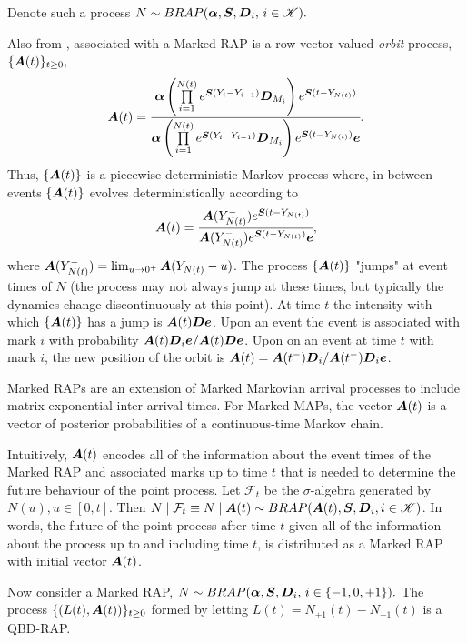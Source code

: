 Denote such a process \(N\sim BRAP(\boldsymbol \alpha, \boldsymbol S, \boldsymbol D_i,\,i\in\mathscr K).\)

Also from \cite{bn2010}, associated with a Marked RAP is a row-vector-valued \emph{orbit} process, \(\{\boldsymbol A(t)\}_{t\geq0},\)
\[\boldsymbol A(t) = \cfrac{\boldsymbol \alpha\left( \prod\limits_{i=1}^{N(t)} e^{\boldsymbol S(Y_{i}-Y_{i-1})}\boldsymbol D_{M_i}\right)e^{\boldsymbol S (t-Y_{N(t)})}}{\boldsymbol \alpha\left( \prod\limits_{i=1}^{N(t)} e^{\boldsymbol S(Y_{i}-Y_{i-1})}\boldsymbol D_{M_i}\right)e^{\boldsymbol S( t-Y_{N(t)})}\boldsymbol e}.\]
Thus, \(\{\boldsymbol A(t)\}\) is a piecewise-deterministic Markov process where, in between events \(\{\boldsymbol A(t)\}\) evolves deterministically according to 
\[\boldsymbol A(t) = \cfrac{\boldsymbol A(Y_{N(t)}^-)e^{\boldsymbol S(t-Y_{N(t)})}}{\boldsymbol A(Y_{N(t)}^-)e^{\boldsymbol S(t-Y_{N(t)})}\boldsymbol e},\]
where \(\boldsymbol A(Y_{N(t)}^-) = \lim_{u\to 0^+}\boldsymbol A(Y_{N(t)}-u)\). The process \(\{\boldsymbol A(t)\}\) "jumps" at event times of \(N\) (the process may not always jump at these times, but typically the dynamics change discontinuously at this point). At time \(t\) the intensity with which \(\{\boldsymbol A(t)\}\) has a jump is \(\boldsymbol A(t) \boldsymbol D\boldsymbol e\). Upon an event the event is associated with mark \(i\) with probability \(\boldsymbol A(t) \boldsymbol D_i\boldsymbol e/\boldsymbol A(t) \boldsymbol D\boldsymbol e\). Upon on an event at time \(t\) with mark \(i\), the new position of the orbit is \(\boldsymbol A(t) = \boldsymbol A(t^-) \boldsymbol D_i/\boldsymbol A(t^-) \boldsymbol D_i\boldsymbol e\). 

Marked RAPs are an extension of Marked Markovian arrival processes to include matrix-exponential inter-arrival times. For Marked MAPs, the vector \(\boldsymbol A(t)\) is a vector of posterior probabilities of a continuous-time Markov chain. 

Intuitively, \(\boldsymbol A(t)\) encodes all of the information about the event times of the Marked RAP and associated marks up to time \(t\) that is needed to determine the future behaviour of the point process. Let \(\mathcal F_{t}\) be the \(\sigma\)-algebra generated by \(N(u), u\in[0,t]\). Then \(N\mid \mathcal F_t \equiv N\mid \boldsymbol A(t) \sim BRAP(\boldsymbol A(t), \boldsymbol S, \boldsymbol D_i,i\in\mathscr K)\). In words, the future of the point process after time \(t\) given all of the information about the process up to and including time \(t\), is distributed as a Marked RAP with initial vector \(\boldsymbol A(t)\). 

Now consider a Marked RAP, \(N\sim BRAP(\boldsymbol \alpha, \boldsymbol S, \boldsymbol D_i,\,i\in\{-1,0,+1\}).\) The process \(\{(L(t),\boldsymbol A(t))\}_{t\geq0}\) formed by letting \(L(t) = N_{+1}(t) - N_{-1}(t)\) is a QBD-RAP. 

